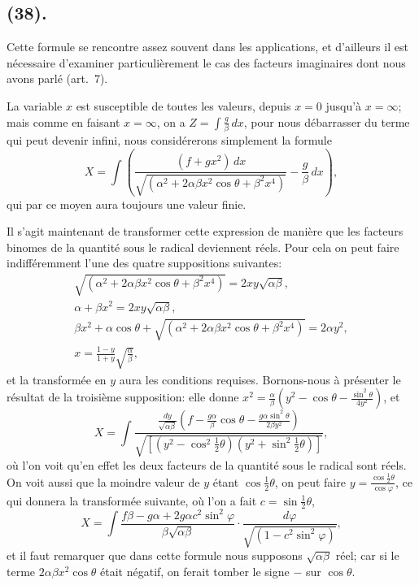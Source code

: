 \documentclass{article}
\begin{document}
\subsection*{(38).}

Cette formule se rencontre assez souvent dans les applications, et d'ailleurs il est nécessaire d'examiner particulièrement le cas des facteurs imaginaires dont nous avons parlé (art.~7).


La variable $x$ est susceptible de toutes les valeurs, depuis $x=0$ jusqu'à $x=\infty$; mais comme en faisant $x=\infty$, on a $Z=\displaystyle\int\frac{g}{\beta}\,dx$, pour nous débarrasser du terme qui peut devenir infini, nous considérerons simplement la formule
\[ X=\int\left(\frac{(f+gx^{2})\,dx}{\sqrt{(\alpha^{2}+2\alpha\beta x^{2}\cos\theta+\beta^{2}x^{4})}}-\frac{g}{\beta}\,dx\right), \]
qui par ce moyen aura toujours une valeur finie.

Il s'agit maintenant de transformer cette expression de manière que les facteurs binomes de la quantité sous le radical deviennent réels. Pour cela on peut faire indifféremment l'une des quatre suppositions suivantes:
\[ \begin{gathered} \sqrt{(\alpha^{2}+2\alpha\beta x^{2}\cos\theta+\beta^{2}x^{4})}=2xy\sqrt{\alpha\beta},\\ \alpha+\beta x^{2}=2xy\sqrt{\alpha\beta},\\ \beta x^{2}+\alpha\cos\theta+\sqrt{(\alpha^{2}+2\alpha\beta x^{2}\cos\theta+\beta^{2}x^{4})}=2\alpha y^{2},\\ x=\frac{1-y}{1+y}\sqrt{\frac{\alpha}{\beta}}, \end{gathered} \]
et la transformée en $y$ aura les conditions requises. Bornons-nous à présenter le résultat de la troisième supposition: elle donne $x^{2}=\frac{\alpha}{\beta}\left(y^{2}-\cos\theta-\frac{\sin^{2}\theta}{4y^{2}}\right)$, et
\[ X=\int\frac{\frac{dy}{\sqrt{\alpha\beta}}\left(f-\frac{g\alpha}{\beta}\cos\theta-\frac{g\alpha\sin^{2}\theta}{2\beta y^{2}}\right)}{\sqrt{[(y^{2}-\cos^{2}\tfrac{1}{2}\theta)(y^{2}+\sin^{2}\tfrac{1}{2}\theta)]}}, \]
où l'on voit qu'en effet les deux facteurs de la quantité sous le radical sont réels. On voit aussi que la moindre valeur de $y$ étant $\cos\frac{1}{2}\theta$, on peut faire $y=\frac{\cos\frac{1}{2}\theta}{\cos\varphi}$, ce qui donnera la transformée suivante, où l'on a fait $c=\sin\frac{1}{2}\theta$,
\[ X=\int\frac{f\beta-g\alpha+2g\alpha c^{2}\sin^{2}\varphi}{\beta\sqrt{\alpha\beta}}\cdot\frac{d\varphi}{\sqrt{(1-c^{2}\sin^{2}\varphi)}}, \]
et il faut remarquer que dans cette formule nous supposons $\sqrt{\alpha\beta}$ réel; car si le terme $2\alpha\beta x^{2}\cos\theta$ était négatif, on ferait tomber le signe $-$ sur $\cos\theta$.
\end{document}
